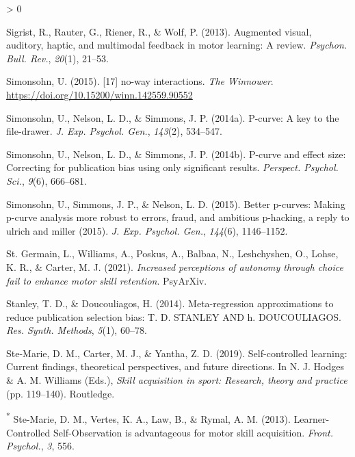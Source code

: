 \documentclass[
  english,
  man,floatsintext]{apa7}
\newlength{\cslhangindent}
\newenvironment{CSLReferences}[2] %
 {%
  \setlength{\parindent}{0pt}
  \ifodd #1 \everypar{\setlength{\hangindent}{\cslhangindent}}\ignorespaces\fi
  \ifnum #2 > 0
  \setlength{\parskip}{#2\baselineskip}
  \fi
 }%
 {}
\begin{document}
\begin{CSLReferences}{1}{0}
\leavevmode\hypertarget{ref-Sigrist2013-ux}{}%
Sigrist, R., Rauter, G., Riener, R., \& Wolf, P. (2013). Augmented visual, auditory, haptic, and multimodal feedback in motor learning: A review. \emph{Psychon. Bull. Rev.}, \emph{20}(1), 21--53.

\leavevmode\hypertarget{ref-Simonsohn2014-blog}{}%
Simonsohn, U. (2015). {[}17{]} no-way interactions. \emph{The Winnower}. \url{https://doi.org/10.15200/winn.142559.90552}

\leavevmode\hypertarget{ref-Simonsohn2014-yo}{}%
Simonsohn, U., Nelson, L. D., \& Simmons, J. P. (2014a). P-curve: A key to the file-drawer. \emph{J. Exp. Psychol. Gen.}, \emph{143}(2), 534--547.

\leavevmode\hypertarget{ref-Simonsohn2014-xq}{}%
Simonsohn, U., Nelson, L. D., \& Simmons, J. P. (2014b). P-curve and effect size: Correcting for publication bias using only significant results. \emph{Perspect. Psychol. Sci.}, \emph{9}(6), 666--681.

\leavevmode\hypertarget{ref-Simonsohn2015-mn}{}%
Simonsohn, U., Simmons, J. P., \& Nelson, L. D. (2015). Better p-curves: Making p-curve analysis more robust to errors, fraud, and ambitious p-hacking, a reply to ulrich and miller (2015). \emph{J. Exp. Psychol. Gen.}, \emph{144}(6), 1146--1152.

\leavevmode\hypertarget{ref-StGermain2021-lg}{}%
St. Germain, L., Williams, A., Poskus, A., Balbaa, N., Leshchyshen, O., Lohse, K. R., \& Carter, M. J. (2021). \emph{Increased perceptions of autonomy through choice fail to enhance motor skill retention}. PsyArXiv.

\leavevmode\hypertarget{ref-Stanley2014-xl}{}%
Stanley, T. D., \& Doucouliagos, H. (2014). Meta-regression approximations to reduce publication selection bias: T. D. {STANLEY} {AND} h. {DOUCOULIAGOS}. \emph{Res. Synth. Methods}, \emph{5}(1), 60--78.

\leavevmode\hypertarget{ref-Ste-Marie2019-bw}{}%
Ste-Marie, D. M., Carter, M. J., \& Yantha, Z. D. (2019). Self-controlled learning: Current findings, theoretical perspectives, and future directions. In N. J. Hodges \& A. M. Williams (Eds.), \emph{Skill acquisition in sport: Research, theory and practice} (pp. 119--140). Routledge.

\leavevmode\hypertarget{ref-Ste-Marie2013-uc}{}%
\textsuperscript{*} Ste-Marie, D. M., Vertes, K. A., Law, B., \& Rymal, A. M. (2013). {Learner-Controlled} {Self-Observation} is advantageous for motor skill acquisition. \emph{Front. Psychol.}, \emph{3}, 556.


\end{CSLReferences}
\end{document}
